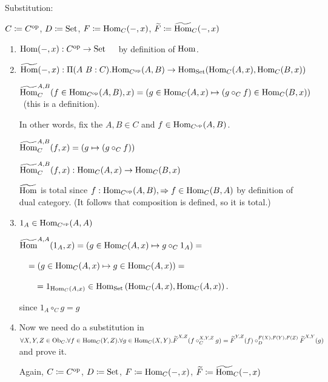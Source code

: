 \documentclass[10pt,a4paper]{article}
\begin{document}


\myprf

Substitution:

$C \coloneqq C^{\textrm{op}}$, 
$D \coloneqq {\textrm{Set}}$, 
$F \coloneqq {\textrm{Hom}}_C(-,x)$, 
${\widetilde{F}\textrm{}} \coloneqq {\widetilde{{\textrm{Hom}}}\textrm{}}_C(-,x)$

\begin{enumerate}
\item ${\textrm{Hom}}(-, x) : C^{\textrm{op}} \to {\textrm{Set}}$\ \ \ by definition of ${\textrm{Hom}}$.
\item $\HomMor(-, x) :\Pi(A\ B:C).\Hom_{C^\op}(A,B) \to \Hom_\Set(\Hom_C(A,x), \Hom_C(B,x))$

${\widetilde{{\textrm{Hom}}}\textrm{}}_C^{A,B}(f\in{\textrm{Hom}}_{C^{\textrm{op}}}(A,B), x) = (g \in{\textrm{Hom}}_C(A,x) \mapsto (g \circ_C f) \in{\textrm{Hom}}_C(B,x))$\ (this is a definition).

In other words, fix the $A,B\in C$ and $f\in{\textrm{Hom}}_{C^{\textrm{op}}}(A,B)$.

${\widetilde{{\textrm{Hom}}}\textrm{}}_C^{A,B}(f, x) = (g\mapsto (g \circ_C f))$

${\widetilde{{\textrm{Hom}}}\textrm{}}_C^{A,B}(f, x) : {\textrm{Hom}}_C(A,x) \to {\textrm{Hom}}_C(B,x)$


${\widetilde{{\textrm{Hom}}}\textrm{}}$ is total since $f:{\textrm{Hom}}_{C^{\textrm{op}}}(A,B), \Rightarrow f\in{\textrm{Hom}}_C(B,A)$ by definition of dual category. (It follows that composition is defined, so it is total.)
\item $1_A\in{\textrm{Hom}}_{C^{\textrm{op}}}(A,A)$

${\widetilde{{\textrm{Hom}}}\textrm{}}^{A,A}(1_A, x) = \left(g \in{\textrm{Hom}}_C(A,x)\mapsto g \circ_C 1_A\right) = $

$\quad = \left(g \in{\textrm{Hom}}_C(A,x) \mapsto g \in{\textrm{Hom}}_C(A,x)\right) =$

$\quad \quad = 1_{{\textrm{Hom}}_C(A,x)} \in {\textrm{Hom}}_{\textrm{Set}}\left({\textrm{Hom}}_C(A,x), {\textrm{Hom}}_C(A,x)\right).$

since $1_A \circ_C g = g$

\item Now we need do a substitution in
$\forall X,Y,Z \in {\textrm{Ob}}_C.\forall f\in{\textrm{Hom}}_C(Y,Z).\forall g\in{\textrm{Hom}}_C(X,Y). {\widetilde{F}\textrm{}}^{X,Z}(f\circ_C^{X,Y,Z} g)={\widetilde{F}\textrm{}}^{Y,Z}(f)\circ_D^{F(X),F(Y),F(Z)} {\widetilde{F}\textrm{}}^{X,Y}(g)$ and prove it.

Again, $C \coloneqq C^{\textrm{op}}$, 
$D \coloneqq {\textrm{Set}}$, 
$F \coloneqq {\textrm{Hom}}_C(-,x)$, 
${\widetilde{F}\textrm{}} \coloneqq {\widetilde{{\textrm{Hom}}}\textrm{}}_C(-,x)$


\end{enumerate}
\end{document}
